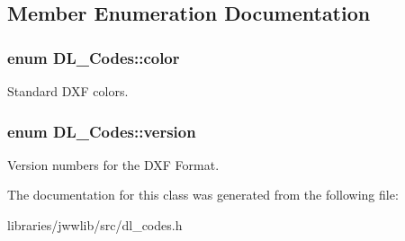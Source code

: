 \subsection{Member Enumeration Documentation}
\hypertarget{classDL__Codes_af9168b178c93c91b220ddf8c1414a552}{
\subsubsection[{color}]{\setlength{\rightskip}{0pt plus 5cm}enum {\bf D\-L\-\_\-\-Codes\-::color}}}\label{classDL__Codes_af9168b178c93c91b220ddf8c1414a552}
Standard D\-X\-F colors. \hypertarget{classDL__Codes_a5eba107e2d280c70b52ffab0292fb9dc}{
\subsubsection[{version}]{\setlength{\rightskip}{0pt plus 5cm}enum {\bf D\-L\-\_\-\-Codes\-::version}}}\label{classDL__Codes_a5eba107e2d280c70b52ffab0292fb9dc}
Version numbers for the D\-X\-F Format. 

The documentation for this class was generated from the following file\-:\begin{DoxyCompactItemize}
\item 
libraries/jwwlib/src/dl\-\_\-codes.\-h\end{DoxyCompactItemize}

